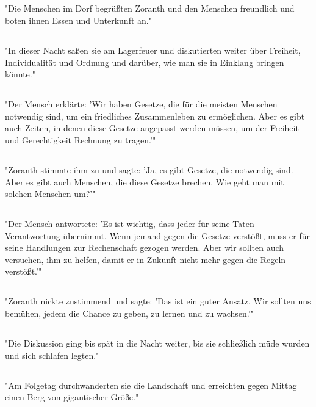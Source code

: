\documentclass{article}
\begin{document}
\subsection{}
"Die Menschen im Dorf begrüßten Zoranth und den Menschen freundlich und boten ihnen Essen und Unterkunft an."
\subsection{}
"In dieser Nacht saßen sie am Lagerfeuer und diskutierten weiter über Freiheit, Individualität und Ordnung und darüber, wie man sie in Einklang bringen könnte."
\subsection{}
"Der Mensch erklärte: 'Wir haben Gesetze, die für die meisten Menschen notwendig sind, um ein friedliches Zusammenleben zu ermöglichen. Aber es gibt auch Zeiten, in denen diese Gesetze angepasst werden müssen, um der Freiheit und Gerechtigkeit Rechnung zu tragen.'"
\subsection{}
"Zoranth stimmte ihm zu und sagte: 'Ja, es gibt Gesetze, die notwendig sind. Aber es gibt auch Menschen, die diese Gesetze brechen. Wie geht man mit solchen Menschen um?'"
\subsection{}
"Der Mensch antwortete: 'Es ist wichtig, dass jeder für seine Taten Verantwortung übernimmt. Wenn jemand gegen die Gesetze verstößt, muss er für seine Handlungen zur Rechenschaft gezogen werden. Aber wir sollten auch versuchen, ihm zu helfen, damit er in Zukunft nicht mehr gegen die Regeln verstößt.'"
\subsection{}
"Zoranth nickte zustimmend und sagte: 'Das ist ein guter Ansatz. Wir sollten uns bemühen, jedem die Chance zu geben, zu lernen und zu wachsen.'"
\subsection{}
"Die Diskussion ging bis spät in die Nacht weiter, bis sie schließlich müde wurden und sich schlafen legten."
\subsection{}
"Am Folgetag durchwanderten sie die Landschaft und erreichten gegen Mittag einen Berg von gigantischer Größe."
\end{document}
